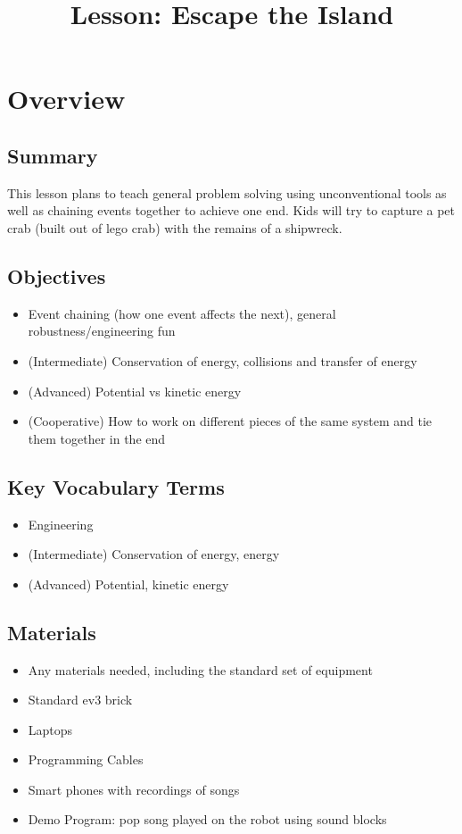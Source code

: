 \documentclass{lessonplan}
\title{\lessonNumber Lesson: Escape the Island}
\author{\linkHome}
\date{}
\begin{document}
  \maketitle

  \section{Overview}
    \subsection{Summary}
      This lesson plans to teach general problem solving using unconventional
      tools as well as chaining events together to achieve one end. Kids will
      try to capture a pet crab (built out of lego crab) with the remains
      of a shipwreck.

    \subsection{Objectives}
    \begin{itemize}
      \item Event chaining (how one event affects the next),
      general robustness/engineering fun
      \item (Intermediate) Conservation of energy, collisions and transfer
      of energy
      \item (Advanced) Potential vs kinetic energy
      \item (Cooperative) How to work on different pieces of the same system
      and tie them together in the end
    \end{itemize}

    \subsection{Key Vocabulary Terms}
    \begin{itemize}
      \item Engineering
      \item (Intermediate) Conservation of energy, energy
      \item (Advanced) Potential, kinetic energy
    \end{itemize}

    \subsection{Materials}
      \begin{itemize}
        \item Any materials needed, including the standard set of
          equipment
        \item Standard ev3 brick
        \item Laptops
        \item Programming Cables
        \item Smart phones with recordings of songs
        \item Demo Program: pop song played on the robot using sound
          blocks
      \end{itemize}
\end{document}
